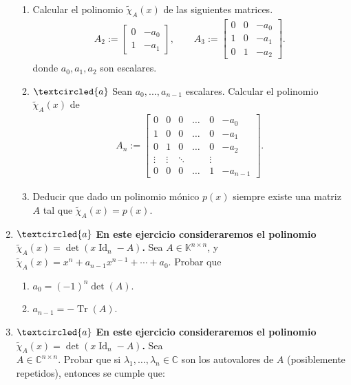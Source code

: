 \begin{enumerate}[resume,topsep=6pt,itemsep=.4cm]
\begin{enumerate}
\item  Calcular el polinomio $\tilde\chi_A(x)$ de las siguientes matrices.
\begin{align*}
A_2 := \begin{bmatrix} 0 & -a_0 \\ 1 & -a_1
\end{bmatrix},\quad\quad
A_3 := \begin{bmatrix} 0 & 0 & -a_0 \\ 1 & 0 & -a_1 \\ 0 & 1 & -a_2
\end{bmatrix}.
\end{align*}
donde $a_0, a_1, a_2$ son escalares.

\item\label{matriz de un polinomio} $\textcircled{a}$ Sean $a_0, ..., a_{n-1}$ escalares. Calcular el polinomio $\tilde\chi_A(x)$ de
\begin{align*}
A_n := \begin{bmatrix} 0 & 0 & 0 &\dots & 0 & -a_0 \\ 1 & 0 & 0&  \dots & 0  & -a_1 \\ 0 & 1 & 0&  \dots & 0  & -a_2 \\ \vdots & \vdots & \ddots & \quad  & \vdots\\ 0 & 0 & 0 & \dots & 1  & -a_{n-1}
\end{bmatrix}.        
 \end{align*}

 \item Deducir que dado un polinomio mónico $p(x)$ siempre existe una matriz $A$ tal que $\tilde\chi_A(x)=p(x)$.


\end{enumerate}


\item\label{tr det}$\textcircled{a}$ {\bf En este ejercicio consideraremos el polinomio $\tilde\chi_A(x)=\det(x\operatorname{Id}_n-A)$.}
Sea $A\in\mathbb{K}^{n\times n}$, y \ $\tilde\chi_A(x) = x^n+a_{n-1}x^{n-1}+\cdots+a_0$. Probar que


\begin{enumerate}
    \item $a_0 = (-1)^n \det(A)$.
    \item $a_{n-1} = - \operatorname{Tr}(A)$.
\end{enumerate}


\item\label{complejos} $\textcircled{a}$ {\bf En este ejercicio consideraremos el polinomio $\tilde\chi_A(x)=\det(x\operatorname{Id}_n-A)$.} Sea \\ $A\in\mathbb{C}^{n\times n}$. Probar que si $\lambda_1,\dots,\lambda_n \in \mathbb C$ son los autovalores de $A$
(posiblemente repetidos), entonces se cumple que:



\end{enumerate}
